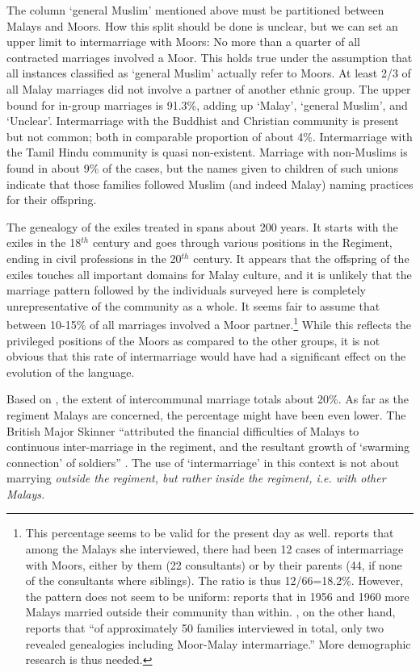 The column `general Muslim' mentioned above must be partitioned between Malays and Moors. How this split should be done is unclear, but we can set an upper limit to intermarriage with Moors: No more than a quarter of all contracted marriages involved a Moor. This holds true under the assumption that all instances classified as `general Muslim' actually refer to Moors. At least 2/3 of all Malay marriages did not involve a partner of another ethnic group. The upper bound for in-group marriages is 91.3\%, adding up `Malay', `general Muslim', and `Unclear'. Intermarriage with the Buddhist and Christian community is present but not common; both in comparable proportion of about 4\%. Intermarriage with the Tamil Hindu community is quasi non-existent. Marriage with non-Muslims is found in about 9\% of the cases, but the names given to children of such unions indicate that those families followed Muslim (and indeed Malay) naming practices for their offspring.

The genealogy of the exiles treated in \citet{ArfinBurah} spans about 200 years. It  starts with the exiles in the 18$^{th}$ century and goes through various positions in the Regiment, ending in civil professions in the 20$^{th}$ century. It appears that the offspring of the exiles touches all important domains for Malay culture, and it is unlikely that the marriage pattern followed by the individuals surveyed here is completely unrepresentative of the community as a whole. It seems fair to assume that between 10-15\% of all marriages involved a Moor partner.\footnote{This percentage seems to be valid for the present day as well. \citet[39]{Bichsel} reports that among the   Malays she interviewed, there had been 12 cases of intermarriage with Moors, either by them (22 consultants) or by their parents (44, if none of the consultants where siblings). The ratio is thus 12/66=18.2\%. However, the pattern does not seem to be uniform: \citet[417]{Nuhman2007} reports that in 1956 and 1960 more Malays married outside their community than within. \citet{Ansaldo2008genesis}, on the other hand, reports that ``of approximately 50 families interviewed in total, only two revealed genealogies including Moor-Malay
intermarriage.'' More demographic research is thus needed.} While this reflects the privileged positions of the Moors as compared to the other groups, it is not obvious that this rate of intermarriage would have had a significant effect on the evolution of the language.

Based on \citet{ArfinBurah}, the extent of intercommunal marriage totals about 20\%. As far as the regiment Malays are concerned, the percentage might have been even lower. The British Major Skinner ``attributed the financial difficulties of Malays to continuous inter-marriage in the regiment, and the resultant growth of `swarming connection' of soldiers'' \citep[119]{Hussainmiya1990}. The use of `intermarriage' in this context is not about marrying \em outside \em the regiment, but rather \em inside \em the regiment, i.e. with other Malays.


